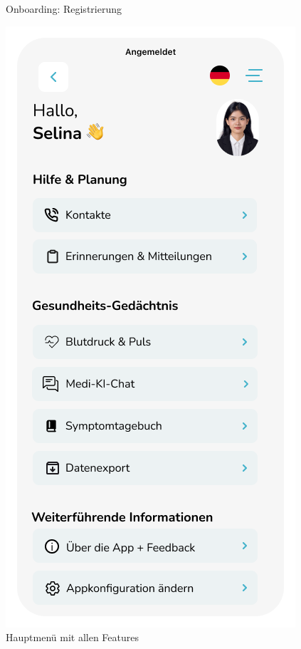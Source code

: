 \begin{figure}[h!]
\begin{minipage}{0.3\linewidth}
		\caption{Onboarding: Registrierung}
		\label{fig:registrierung}
\end{minipage}
	\hfill
	\begin{minipage}{0.3\linewidth}
		\centering
		\includegraphics[width=\linewidth]{"images/Homescreen mit Symptomtagebuch"}
		\caption{Hauptmenü mit allen Features}
		\label{fig:homescreen-mit-symptomtagebuch}
	\end{minipage}
\end{figure}

